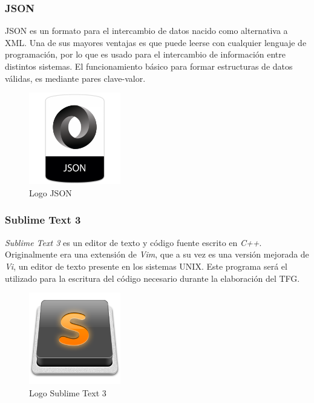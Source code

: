 		\subsubsection{\ac{JSON}}
		\ac{JSON} es un formato para el intercambio de datos nacido como alternativa a \ac{XML}. Una de sus mayores ventajas es que puede leerse con cualquier lenguaje de programación, por lo que es usado para el intercambio de información entre distintos sistemas. El funcionamiento básico para formar estructuras de datos válidas, es mediante pares clave-valor.
		
		\begin{figure}[H]
		\centering
		\includegraphics[width=40mm, fbox={\fboxrule} 4mm]{images/04-metodo/28-json_logo.png}
		\caption{Logo JSON}
		\label{fig:json-logo}
		\end{figure}	
		
		\subsubsection{Sublime Text 3}
		\textit{Sublime Text 3} es un editor de texto y código fuente escrito en \textit{C++}. Originalmente era una extensión de \textit{Vim}, que a su vez es una versión mejorada de \textit{Vi}, un editor de texto presente en los sistemas UNIX.
		Este programa será el utilizado para la escritura del código necesario durante la elaboración del \ac{TFG}.
		
		\begin{figure}[H]
		\centering
		\includegraphics[width=40mm, fbox={\fboxrule} 4mm]{images/04-metodo/29-sublime_text_logo.png}
		\caption{Logo Sublime Text 3}
		\label{fig:sublime-text-logo}
		\end{figure}
		
